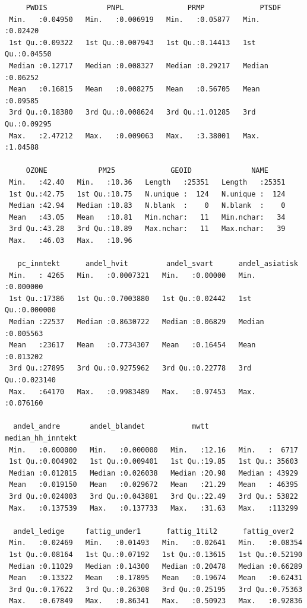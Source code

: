 \documentclass[
  norsk,
  a4paper,
]{article}
\begin{document}
\begin{verbatim}
     PWDIS              PNPL               PRMP             PTSDF        
 Min.   :0.04950   Min.   :0.006919   Min.   :0.05877   Min.   :0.02420  
 1st Qu.:0.09322   1st Qu.:0.007943   1st Qu.:0.14413   1st Qu.:0.04550  
 Median :0.12717   Median :0.008327   Median :0.29217   Median :0.06252  
 Mean   :0.16815   Mean   :0.008275   Mean   :0.56705   Mean   :0.09585  
 3rd Qu.:0.18380   3rd Qu.:0.008624   3rd Qu.:1.01285   3rd Qu.:0.09295  
 Max.   :2.47212   Max.   :0.009063   Max.   :3.38001   Max.   :1.04588  
                                                                         
     OZONE            PM25             GEOID              NAME      
 Min.   :42.40   Min.   :10.36   Length   :25351   Length   :25351  
 1st Qu.:42.75   1st Qu.:10.75   N.unique :  124   N.unique :  124  
 Median :42.94   Median :10.83   N.blank  :    0   N.blank  :    0  
 Mean   :43.05   Mean   :10.81   Min.nchar:   11   Min.nchar:   34  
 3rd Qu.:43.28   3rd Qu.:10.89   Max.nchar:   11   Max.nchar:   39  
 Max.   :46.03   Max.   :10.96                                      
                                                                    
   pc_inntekt      andel_hvit         andel_svart      andel_asiatisk    
 Min.   : 4265   Min.   :0.0007321   Min.   :0.00000   Min.   :0.000000  
 1st Qu.:17386   1st Qu.:0.7003880   1st Qu.:0.02442   1st Qu.:0.000000  
 Median :22537   Median :0.8630722   Median :0.06829   Median :0.005563  
 Mean   :23617   Mean   :0.7734307   Mean   :0.16454   Mean   :0.013202  
 3rd Qu.:27895   3rd Qu.:0.9275962   3rd Qu.:0.22778   3rd Qu.:0.023140  
 Max.   :64170   Max.   :0.9983489   Max.   :0.97453   Max.   :0.076160  
                                                                         
  andel_andre       andel_blandet           mwtt       median_hh_inntekt
 Min.   :0.000000   Min.   :0.000000   Min.   :12.16   Min.   :  6717   
 1st Qu.:0.004902   1st Qu.:0.009401   1st Qu.:19.85   1st Qu.: 35603   
 Median :0.012815   Median :0.026038   Median :20.98   Median : 43929   
 Mean   :0.019150   Mean   :0.029672   Mean   :21.29   Mean   : 46395   
 3rd Qu.:0.024003   3rd Qu.:0.043881   3rd Qu.:22.49   3rd Qu.: 53822   
 Max.   :0.137539   Max.   :0.137733   Max.   :31.63   Max.   :113299   
                                                                        
  andel_ledige     fattig_under1      fattig_1til2      fattig_over2    
 Min.   :0.02469   Min.   :0.01493   Min.   :0.02641   Min.   :0.08354  
 1st Qu.:0.08164   1st Qu.:0.07192   1st Qu.:0.13615   1st Qu.:0.52190  
 Median :0.11029   Median :0.14300   Median :0.20478   Median :0.66289  
 Mean   :0.13322   Mean   :0.17895   Mean   :0.19674   Mean   :0.62431  
 3rd Qu.:0.17622   3rd Qu.:0.26308   3rd Qu.:0.25195   3rd Qu.:0.75363  
 Max.   :0.67849   Max.   :0.86341   Max.   :0.50923   Max.   :0.92836  
                                                                        

\end{verbatim}
\end{document}
